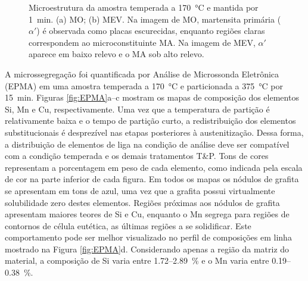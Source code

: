 \begin{figure}
  \centering
  \quad
  \caption{Microestrutura da amostra temperada a \SI{170}{\degreeCelsius} e mantida por 1~min. (a) MO; (b) MEV. Na imagem de MO, martensita primária ($\alpha'$) é observada como placas escurecidas, enquanto regiões claras correspondem ao microconstituinte MA. Na imagem de MEV, $\alpha'$ aparece em baixo relevo e o MA sob alto relevo.}
  \label{fig:temperaInterrompida}
\end{figure}

A microssegregação foi quantificada por Análise de Microssonda Eletrônica (EPMA) em uma amostra temperada a \SI{170}{\degreeCelsius} e particionada a \SI{375}{\degreeCelsius} por 15~min. Figuras \ref{fig:EPMA}a--c mostram os mapas de composição dos elementos Si, Mn e Cu, respectivamente. Uma vez que a temperatura de partição é relativamente baixa e o tempo de partição curto, a redistribuição dos elementos substitucionais é desprezível nas etapas posteriores à austenitização. Dessa forma, a distribuição de elementos de liga na condição de análise deve ser compatível com a condição temperada e os demais tratamentos T\&P. Tons de cores representam a porcentagem em peso de cada elemento, como indicada pela escala de cor na parte inferior de cada figura. Em todos os mapas os nódulos de grafita se apresentam em tons de azul, uma vez que a grafita possui virtualmente solubilidade zero destes elementos. Regiões próximas aos nódulos de grafita apresentam maiores teores de Si e Cu, enquanto o Mn segrega para regiões de contornos de célula eutética, as últimas regiões a se solidificar. Este comportamento pode ser melhor visualizado no perfil de composições em linha mostrado na Figura \ref{fig:EPMA}d. Considerando apenas a região da matriz do material, a composição de Si varia entre 1.72--2.89~\% e o Mn varia entre 0.19--0.38~\%.

